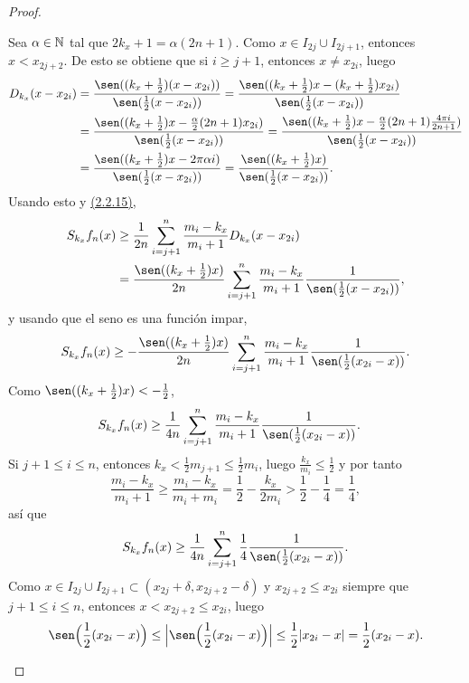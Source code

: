 \documentclass[a4paper, 12pt, oneside]{book}
\begin{document}
\begin{proof}
\begin{itemize}
        Sea $\alpha \in \mathbb N$ tal que $2k_x+1 = \alpha(2n+1)$. Como $x \in I_{2j} \cup I_{2j+1}$, entonces $x < x_{2j+2}$. De esto se obtiene que si $i \geq j+1$, entonces $x \neq x_{2i}$, luego
        \begin{align*}
            D_{k_x}(x-x_{2i}) &= \frac{\sen((k_x+\frac{1}{2})(x-x_{2i}))}{\sen(\frac{1}{2}(x-x_{2i}))} = \frac{\sen((k_x+\frac{1}{2})x-(k_x+\frac{1}{2})x_{2i})}{\sen(\frac{1}{2}(x-x_{2i}))} \\
            &= \frac{\sen((k_x+\frac{1}{2})x-\frac{\alpha}{2}(2n+1)x_{2i})}{\sen(\frac{1}{2}(x-x_{2i}))} = \frac{\sen((k_x+\frac{1}{2})x-\frac{\alpha}{2}(2n+1)\frac{4\pi i}{2n+1})}{\sen(\frac{1}{2}(x-x_{2i}))} \\
            &= \frac{\sen((k_x+\frac{1}{2})x-2\pi\alpha i)}{\sen(\frac{1}{2}(x-x_{2i}))} = \frac{\sen((k_x+\frac{1}{2})x)}{\sen(\frac{1}{2}(x-x_{2i}))}.
        \end{align*}
        Usando esto y \hyperref[2.2.15]{\color{blue}(2.2.15)},
        \begin{align*}
            S_{k_x}f_n(x) &\geq \frac{1}{2n}\sum_{i=j+1}^n \frac{m_i-k_x}{m_i+1}D_{k_x}(x-x_{2i}) \\
            &= \frac{\sen((k_x+\frac{1}{2})x)}{2n}\sum_{i=j+1}^n \frac{m_i-k_x}{m_i+1}\frac{1}{\sen(\frac{1}{2}(x-x_{2i}))},
        \end{align*}
        y usando que el seno es una función impar,
        \[S_{k_x}f_n(x) \geq -\frac{\sen((k_x+\frac{1}{2})x)}{2n}\sum_{i=j+1}^n \frac{m_i-k_x}{m_i+1}\frac{1}{\sen(\frac{1}{2}(x_{2i}-x))}.\]
        Como $\sen((k_x+\frac{1}{2})x) < -\frac{1}{2}$,
        \begin{align*}
            S_{k_x}f_n(x) &\geq \frac{1}{4n}\sum_{i=j+1}^n \frac{m_i-k_x}{m_i+1}\frac{1}{\sen(\frac{1}{2}(x_{2i}-x))}.
        \end{align*}
       Si $j+1 \leq i \leq n$, entonces $k_x < \frac{1}{2}m_{j+1} \leq \frac{1}{2}m_i$, luego $\frac{k_x}{m_i} \leq \frac{1}{2}$ y por tanto
            \[\frac{m_i-k_x}{m_i+1} \geq \frac{m_i-k_x}{m_i+m_i} = \frac{1}{2}-\frac{k_x}{2m_i} > \frac{1}{2}-\frac{1}{4} = \frac{1}{4},\]
        así que
        \[S_{k_x}f_n(x) \geq \frac{1}{4n}\sum_{i=j+1}^n \frac{1}{4}\frac{1}{\sen(\frac{1}{2}(x_{2i}-x))}.\]
        Como $x \in I_{2j} \cup I_{2j+1} \subset (x_{2j}+\delta,x_{2j+2}-\delta)$ y $x_{2j+2}\leq x_{2i}$ siempre que $j+1 \leq i \leq n$, entonces $x < x_{2j+2} \leq x_{2i}$, luego
        \[\sen\Bigl(\frac{1}{2}(x_{2i}-x)\Bigr) \leq \Bigl|\sen\Bigl(\frac{1}{2}(x_{2i}-x)\Bigr)\Bigr| \leq \frac{1}{2}|x_{2i}-x| = \frac{1}{2}(x_{2i}-x).\]

\end{itemize}
\end{proof}
\end{document}

